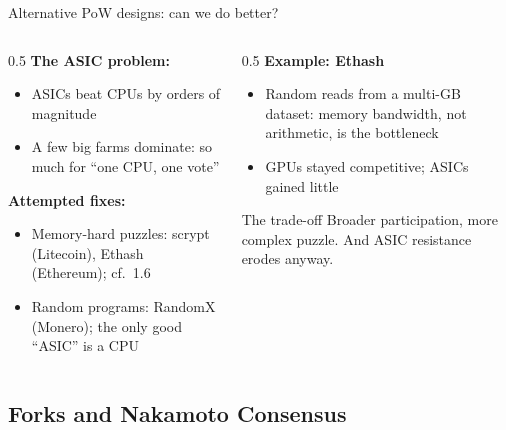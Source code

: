 \ifdefined\PRESENTATION\else\PassOptionsToClass{handout}{beamer}\fi\documentclass[aspectratio=169, lualatex]{beamer}
\begin{document}
\begin{frame}{Alternative PoW designs: can we do better?}
	\begin{columns}[c]
		\begin{column}{0.5\textwidth}
			\textbf{The ASIC problem:}
			\begin{itemize}
				\item ASICs beat CPUs by orders of magnitude
				\item A few big farms dominate: so much for ``one CPU, one vote''
			\end{itemize}
			\textbf{Attempted fixes:}
			\begin{itemize}
				\item Memory-hard puzzles: scrypt (Litecoin), Ethash (Ethereum); cf.\ 1.6
				\item Random programs: RandomX (Monero); the only good ``ASIC'' is a CPU
			\end{itemize}
		\end{column}
		\begin{column}{0.5\textwidth}
			\textbf{Example: Ethash}
			\begin{itemize}
				\item Random reads from a multi-GB dataset: memory bandwidth, not arithmetic, is the bottleneck
				\item GPUs stayed competitive; ASICs gained little
			\end{itemize}
			\begin{alertblock}{The trade-off}
				Broader participation, more complex puzzle. And ASIC resistance erodes anyway.
			\end{alertblock}
		\end{column}
	\end{columns}
\end{frame}

\subsection{Forks and Nakamoto Consensus}
\end{document}
